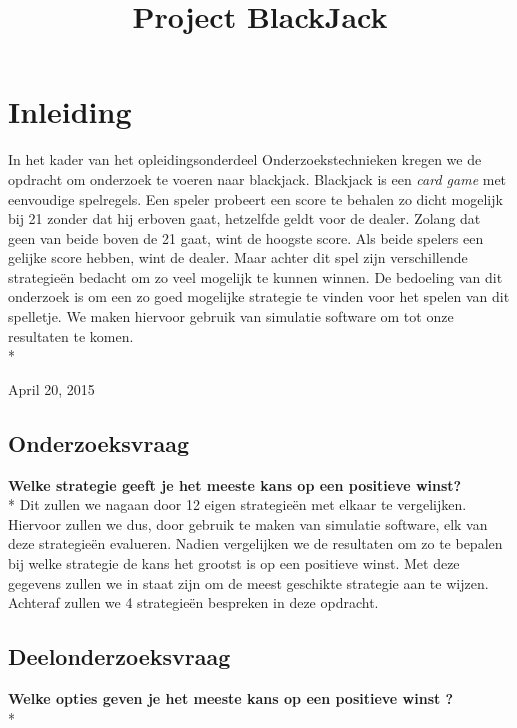 \documentclass[conference]{IEEEtran}
\begin{document}
\title{Project BlackJack}
\author{
}
\maketitle

\IEEEpeerreviewmaketitle

\section{Inleiding}
In het kader van het opleidingsonderdeel Onderzoekstechnieken kregen we de opdracht om onderzoek te voeren naar blackjack. Blackjack is een {\it card game} met eenvoudige spelregels. Een speler probeert een score te behalen zo dicht mogelijk bij 21 zonder dat hij erboven gaat, hetzelfde geldt voor de dealer. Zolang dat geen van beide boven de 21 gaat, wint de hoogste score. Als beide spelers een gelijke score hebben, wint de dealer.
Maar achter dit spel zijn verschillende strategie\"en bedacht om zo veel mogelijk te kunnen winnen. De bedoeling van dit onderzoek is om een zo goed mogelijke strategie te vinden voor het spelen van dit spelletje. We maken hiervoor gebruik van simulatie software om tot onze resultaten te komen.\\*
 
\hfill April 20, 2015

\subsection{Onderzoeksvraag}
\textbf{Welke strategie geeft je het meeste kans op een positieve winst?}\\*
Dit zullen we nagaan door 12 eigen strategie\"en met elkaar te vergelijken.
Hiervoor zullen we dus, door gebruik te maken van simulatie software, elk van deze strategie\"en evalueren.
Nadien vergelijken we de resultaten om zo te bepalen bij welke strategie de kans het grootst is op een positieve winst. Met deze gegevens zullen we in staat zijn om de meest geschikte strategie aan te wijzen.
Achteraf zullen we 4 strategie\"en bespreken in deze opdracht.

\subsection{Deelonderzoeksvraag} 
\textbf{Welke opties geven je het meeste kans op een positieve winst ?} \\*
\end{document}
